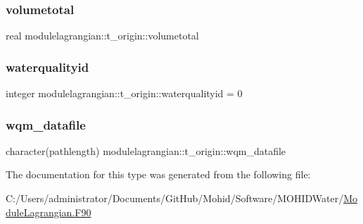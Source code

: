 \subsubsection{\texorpdfstring{volumetotal}{volumetotal}}
{\footnotesize\ttfamily real modulelagrangian\+::t\+\_\+origin\+::volumetotal\hspace{0.3cm}{\ttfamily [private]}}

\mbox{\label{structmodulelagrangian_1_1t__origin_a52052d5602822f7da799921466424c13}} 
\subsubsection{\texorpdfstring{waterqualityid}{waterqualityid}}
{\footnotesize\ttfamily integer modulelagrangian\+::t\+\_\+origin\+::waterqualityid = 0\hspace{0.3cm}{\ttfamily [private]}}

\mbox{\label{structmodulelagrangian_1_1t__origin_a467b88c754ee08ff0274d032c1ecc1d5}} 
\subsubsection{\texorpdfstring{wqm\+\_\+datafile}{wqm\_datafile}}
{\footnotesize\ttfamily character(pathlength) modulelagrangian\+::t\+\_\+origin\+::wqm\+\_\+datafile\hspace{0.3cm}{\ttfamily [private]}}



The documentation for this type was generated from the following file\+:\begin{DoxyCompactItemize}
\item 
C\+:/\+Users/administrator/\+Documents/\+Git\+Hub/\+Mohid/\+Software/\+M\+O\+H\+I\+D\+Water/\mbox{\hyperlink{_module_lagrangian_8_f90}{Module\+Lagrangian.\+F90}}\end{DoxyCompactItemize}

